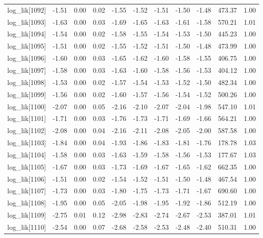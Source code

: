 \begin{table}[ht]
\begin{tabular}{rrrrrrrrrrr}
  log\_lik[1092] & -1.51 & 0.00 & 0.02 & -1.55 & -1.52 & -1.51 & -1.50 & -1.48 & 473.37 & 1.00 \\ 
  log\_lik[1093] & -1.63 & 0.00 & 0.03 & -1.69 & -1.65 & -1.63 & -1.61 & -1.58 & 570.21 & 1.01 \\ 
  log\_lik[1094] & -1.54 & 0.00 & 0.02 & -1.58 & -1.55 & -1.54 & -1.53 & -1.50 & 445.23 & 1.00 \\ 
  log\_lik[1095] & -1.51 & 0.00 & 0.02 & -1.55 & -1.52 & -1.51 & -1.50 & -1.48 & 473.99 & 1.00 \\ 
  log\_lik[1096] & -1.60 & 0.00 & 0.03 & -1.65 & -1.62 & -1.60 & -1.58 & -1.55 & 406.75 & 1.00 \\ 
  log\_lik[1097] & -1.58 & 0.00 & 0.03 & -1.63 & -1.60 & -1.58 & -1.56 & -1.53 & 404.12 & 1.00 \\ 
  log\_lik[1098] & -1.53 & 0.00 & 0.02 & -1.57 & -1.54 & -1.53 & -1.52 & -1.50 & 482.34 & 1.00 \\ 
  log\_lik[1099] & -1.56 & 0.00 & 0.02 & -1.60 & -1.57 & -1.56 & -1.54 & -1.52 & 500.26 & 1.00 \\ 
  log\_lik[1100] & -2.07 & 0.00 & 0.05 & -2.16 & -2.10 & -2.07 & -2.04 & -1.98 & 547.10 & 1.01 \\ 
  log\_lik[1101] & -1.71 & 0.00 & 0.03 & -1.76 & -1.73 & -1.71 & -1.69 & -1.66 & 564.21 & 1.00 \\ 
  log\_lik[1102] & -2.08 & 0.00 & 0.04 & -2.16 & -2.11 & -2.08 & -2.05 & -2.00 & 587.58 & 1.00 \\ 
  log\_lik[1103] & -1.84 & 0.00 & 0.04 & -1.93 & -1.86 & -1.83 & -1.81 & -1.76 & 178.78 & 1.03 \\ 
  log\_lik[1104] & -1.58 & 0.00 & 0.03 & -1.63 & -1.59 & -1.58 & -1.56 & -1.53 & 177.67 & 1.03 \\ 
  log\_lik[1105] & -1.67 & 0.00 & 0.03 & -1.73 & -1.69 & -1.67 & -1.65 & -1.62 & 662.35 & 1.00 \\ 
  log\_lik[1106] & -1.51 & 0.00 & 0.02 & -1.54 & -1.52 & -1.51 & -1.50 & -1.48 & 467.54 & 1.00 \\ 
  log\_lik[1107] & -1.73 & 0.00 & 0.03 & -1.80 & -1.75 & -1.73 & -1.71 & -1.67 & 690.60 & 1.00 \\ 
  log\_lik[1108] & -1.95 & 0.00 & 0.05 & -2.05 & -1.98 & -1.95 & -1.92 & -1.86 & 512.19 & 1.00 \\ 
  log\_lik[1109] & -2.75 & 0.01 & 0.12 & -2.98 & -2.83 & -2.74 & -2.67 & -2.53 & 387.01 & 1.01 \\ 
  log\_lik[1110] & -2.54 & 0.00 & 0.07 & -2.68 & -2.58 & -2.53 & -2.48 & -2.40 & 510.31 & 1.00 \\ 

\end{tabular}
\end{table}
